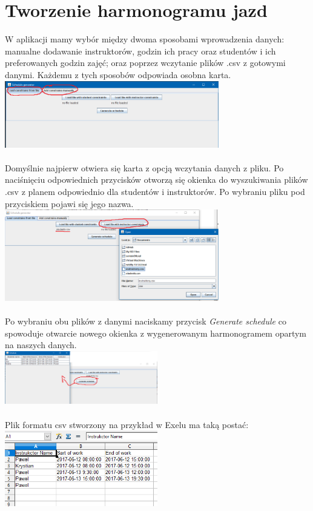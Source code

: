 \documentclass{article}
\begin{document}
\section{Tworzenie harmonogramu jazd}
\par
W aplikacji mamy wybór między dwoma sposobami wprowadzenia danych: manualne dodawanie instruktorów, godzin ich pracy oraz studentów i ich preferowanych godzin zajęć; oraz poprzez wczytanie plików .csv z gotowymi danymi.
Każdemu z tych sposobów odpowiada osobna karta. \\
\includegraphics[width=0.7\textwidth]{screen-karty.png} \\ \\
\newpage
Domyślnie najpierw otwiera się karta z opcją wczytania danych z pliku. Po naciśnięciu odpowiednich przycisków otworzą się okienka do wyszukiwania plików .csv z planem odpowiednio dla studentów i instruktorów. Po wybraniu pliku pod przyciskiem pojawi się jego nazwa. \\ 
\includegraphics[width=0.7\textwidth]{screen-openFile.png} \\ \\ 
Po wybraniu obu plików z danymi naciskamy przycisk \textit{Generate schedule} co spowoduje otwarcie nowego okienka z wygenerowanym harmonogramem opartym na naszych danych.\\
\includegraphics[width=0.5\textwidth]{screen-generate1.png} \\
\\
Plik formatu csv stworzony na przykład w Exelu ma taką postać:\\ \includegraphics[width=0.5\textwidth]{dane-inst.png}
\end{document}

